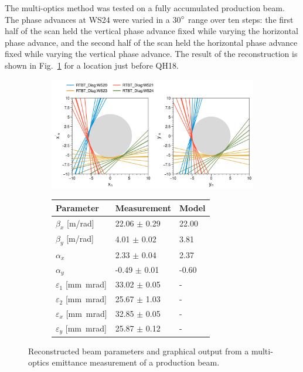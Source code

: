 The multi-optics method was tested on a fully accumulated production beam. The phase advances at WS24 were varied in a 30$\degree$ range over ten steps: the first half of the scan held the vertical phase advance fixed while varying the horizontal phase advance, and the second half of the scan held the horizontal phase advance fixed while varying the vertical phase advance. The result of the reconstruction is shown in Fig.~\ref{fig:prod_meas} for a location just before QH18.
%
\begin{figure}[!p]
    \centering
    \begin{subfigure}{0.8\textwidth}
        \centering
        \includegraphics[width=\textwidth]{Images/chapter4/prod_meas_lines.png}  
    \end{subfigure}
    \par\medskip
    \begin{subfigure}{0.6\textwidth}
        \centering
        \begin{tabular}{lll}
            \small\textbf{Parameter} & \small\textbf{Measurement} & \small\textbf{Model} \\
            \midrule
            \small$\beta_x$ [m/rad] & \small22.06 $\pm$ 0.29 & \small22.00 \\
            \small$\beta_y$ [m/rad] & \small4.01 $\pm$ 0.02 & \small3.81 \\
            \small$\alpha_x$ & \small2.33 $\pm$ 0.04 & \small2.37 \\
            \small$\alpha_y$ & \small-0.49 $\pm$ 0.01 & \small-0.60 \\
            \small$\varepsilon_1$ [mm~mrad] & \small33.02 $\pm$ \small0.05 & - \\
            \small$\varepsilon_2$ [mm~mrad] & \small25.67 $\pm$ \small1.03 & - \\
            \small$\varepsilon_x$ [mm~mrad] & \small32.85 $\pm$ \small0.05 & - \\
            \small$\varepsilon_y$ [mm~mrad] & \small25.87 $\pm$ \small0.12 & - \\
          \end{tabular}
    \end{subfigure}
    \par\medskip
    \caption{Reconstructed beam parameters and graphical output from a multi-optics emittance measurement of a production beam.}
    \label{fig:prod_meas}
\end{figure}
